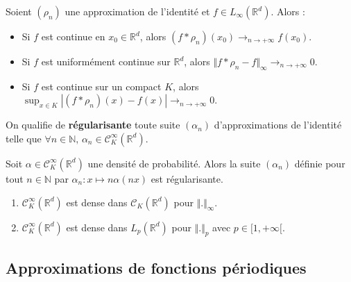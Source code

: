 	\begin{theorem}
		Soient $(\rho_n)$ une approximation de l'identité et $f \in L_\infty(\mathbb{R}^d)$. Alors :
		\begin{itemize}
			\item Si $f$ est continue en $x_0 \in \mathbb{R}^d$, alors $(f * \rho_n)(x_0) \longrightarrow_{n \rightarrow +\infty} f(x_0)$.
			\item Si $f$ est uniformément continue sur $\mathbb{R}^d$, alors $\Vert f * \rho_n - f \Vert_\infty \longrightarrow_{n \rightarrow +\infty} 0$.
			\item Si $f$ est continue sur un compact $K$, alors $\sup_{x \in K} |(f * \rho_n)(x) - f(x)| \longrightarrow_{n \rightarrow +\infty} 0$.
		\end{itemize}
	\end{theorem}

	\begin{definition}
		On qualifie de \textbf{régularisante} toute suite $(\alpha_n)$ d'approximations de l'identité telle que $\forall n \in \mathbb{N}, \, \alpha_n \in \mathcal{C}^\infty_K(\mathbb{R}^d)$.
	\end{definition}


	\begin{example}
		Soit $\alpha \in \mathcal{C}^\infty_K(\mathbb{R}^d)$ une densité de probabilité. Alors la suite $(\alpha_n)$ définie pour tout $n \in \mathbb{N}$ par $\alpha_n : x \mapsto n \alpha(nx)$ est régularisante.
	\end{example}


	\begin{application}
		\begin{enumerate}[label=(\roman*)]
			\item $\mathcal{C}^\infty_K(\mathbb{R}^d)$ est dense dans $\mathcal{C}_K(\mathbb{R}^d)$ pour $\Vert . \Vert_\infty$.
			\item $\mathcal{C}^\infty_K(\mathbb{R}^d)$ est dense dans $L_p(\mathbb{R}^d)$ pour $\Vert . \Vert_p$ avec $p \in [1, +\infty[$.
		\end{enumerate}
	\end{application}

	\subsection{Approximations de fonctions périodiques}

